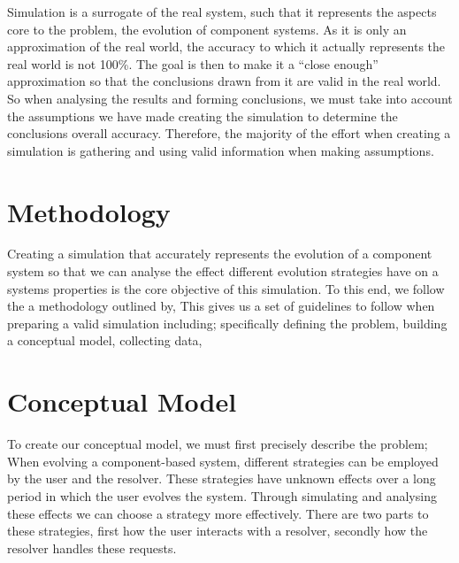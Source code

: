 Simulation is a surrogate of the real system, such that it represents the aspects core to the problem, 
the evolution of component systems.
As it is only an approximation of the real world, 
the accuracy to which it actually represents the real world is not 100\%.
The goal is then to make it a ``close enough'' approximation so that the conclusions drawn from it are valid in the real world.
So when analysing the results and forming conclusions, we must take into account the assumptions we have made creating the simulation to determine 
the conclusions overall accuracy.
Therefore, the majority of the effort when creating a simulation is gathering and using valid information when making assumptions.

\section{Methodology}
Creating a simulation that accurately represents the evolution of a component system so that we can 
analyse the effect different evolution strategies have on a systems properties is the core objective of this simulation.
To this end, we follow the a methodology outlined by, %
This gives us a set of guidelines to follow when preparing a valid simulation including;
specifically defining the problem,
building a conceptual model,
collecting data,





\section{Conceptual Model}
{}To create our conceptual model, we must first precisely describe the problem;
{}When evolving a component-based system, different strategies can be employed by the user and the resolver.
{}These strategies have unknown effects over a long period in which the user evolves the system.
{}Through simulating and analysing these effects we can choose a strategy more effectively.
{}There are two parts to these strategies, first how the user interacts with a resolver, secondly how the resolver handles these requests.

